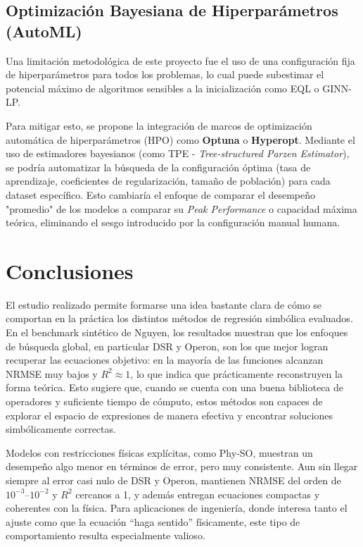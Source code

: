 \subsection{Optimización Bayesiana de Hiperparámetros (AutoML)}
Una limitación metodológica de este proyecto fue el uso de una configuración fija de hiperparámetros para todos los problemas, lo cual puede subestimar el potencial máximo de algoritmos sensibles a la inicialización como EQL o GINN-LP.

Para mitigar esto, se propone la integración de marcos de optimización automática de hiperparámetros (HPO) como \textbf{Optuna} o \textbf{Hyperopt}. Mediante el uso de estimadores bayesianos (como TPE - \textit{Tree-structured Parzen Estimator}), se podría automatizar la búsqueda de la configuración óptima (tasa de aprendizaje, coeficientes de regularización, tamaño de población) para cada dataset específico. Esto cambiaría el enfoque de comparar el desempeño "promedio" de los modelos a comparar su \textit{Peak Performance} o capacidad máxima teórica, eliminando el sesgo introducido por la configuración manual humana.




\newpage
\section{Conclusiones}


El estudio realizado permite formarse una idea bastante clara de cómo se comportan en la
práctica los distintos métodos de regresión simbólica evaluados. En el benchmark sintético
de Nguyen, los resultados muestran que los enfoques de búsqueda global, en particular DSR
y Operon, son los que mejor logran recuperar las ecuaciones objetivo: en la mayoría de las
funciones alcanzan NRMSE muy bajos y $R^{2} \approx 1$, lo que indica que prácticamente
reconstruyen la forma teórica. Esto sugiere que, cuando se cuenta con una buena biblioteca
de operadores y suficiente tiempo de cómputo, estos métodos son capaces de explorar el
espacio de expresiones de manera efectiva y encontrar soluciones simbólicamente correctas.

Modelos con restricciones físicas explícitas, como Phy-SO, muestran un desempeño algo
menor en términos de error, pero muy consistente. Aun sin llegar siempre al error casi nulo
de DSR y Operon, mantienen NRMSE del orden de $10^{-3}$–$10^{-2}$ y $R^{2}$ cercanos a
1, y además entregan ecuaciones compactas y coherentes con la física. Para aplicaciones de
ingeniería, donde interesa tanto el ajuste como que la ecuación “haga sentido” físicamente,
este tipo de comportamiento resulta especialmente valioso.

